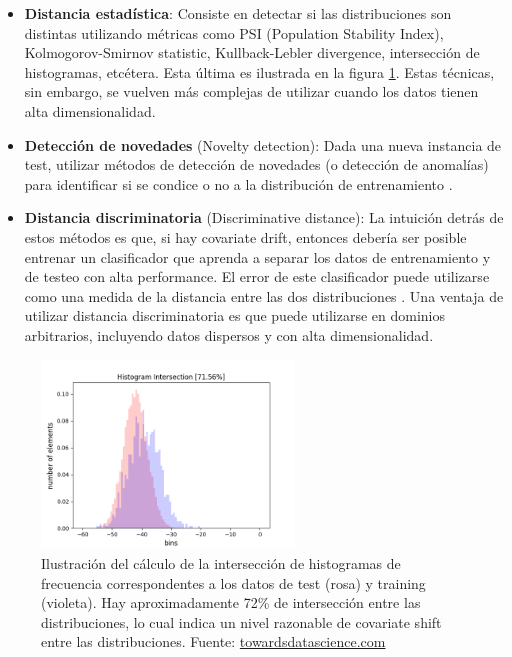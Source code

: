 \begin{itemize}
\item \textbf{Distancia estadística}: Consiste en detectar si las distribuciones son distintas utilizando métricas como PSI (Population Stability Index), Kolmogorov-Smirnov statistic, Kullback-Lebler divergence, intersección de histogramas, etcétera. Esta última es ilustrada en la figura \ref{fig:hist_intersection}. Estas técnicas, sin embargo, se vuelven más complejas de utilizar cuando los datos tienen alta dimensionalidad.
\item \textbf{Detección de novedades} (Novelty detection): Dada una nueva instancia de test, utilizar métodos de detección de novedades (o detección de anomalías) para identificar si se condice o no a la distribución de entrenamiento \cite{noveltydetection}.
\item \textbf{Distancia discriminatoria} (Discriminative distance): La intuición detrás de estos métodos es que, si hay covariate drift, entonces debería ser posible entrenar un clasificador que aprenda a separar los datos de entrenamiento y de testeo con alta performance. El error de este clasificador puede utilizarse como una medida de la distancia entre las dos distribuciones \cite{discriminative_distance} \cite{GeetaDharani2019CovariateSA}. Una ventaja de utilizar distancia discriminatoria es que puede utilizarse en dominios arbitrarios, incluyendo datos dispersos y con alta dimensionalidad.
\end{itemize}

\begin{figure}[h!]
\centering
  \includegraphics[width=0.6\textwidth]{Kap8/histogram_intersection.png}  
\caption{Ilustración del cálculo de la intersección de histogramas de frecuencia correspondentes a los datos de test (rosa) y training (violeta). Hay aproximadamente 72\% de intersección entre las distribuciones, lo cual indica un nivel razonable de covariate shift entre las distribuciones. Fuente: \url{towardsdatascience.com}}
\label{fig:hist_intersection}
\end{figure}

